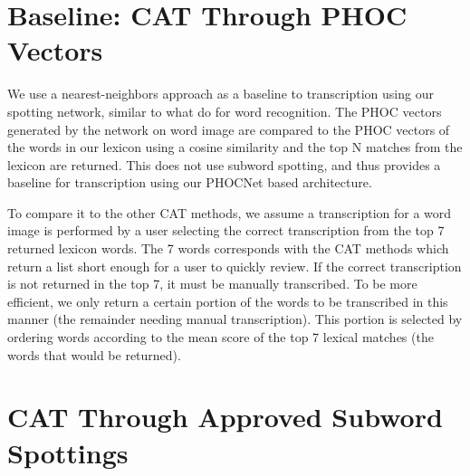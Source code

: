 \documentclass[ms,electronic,twosidetoc,letterpaper,chaptercenter,parttop,lof,lot]{byumsphd}
\begin{document}
\section{Baseline: CAT Through PHOC Vectors}
We use a nearest-neighbors approach as a baseline to transcription using our spotting network, similar to what \cite{krishnan2016} do for word recognition. The PHOC vectors generated by the network on word image are compared to the PHOC vectors of the  words in our lexicon using a cosine similarity and the top N matches from the lexicon are returned. This does not use subword spotting, and thus provides a baseline for transcription using our PHOCNet based architecture.

To compare it to the other CAT methods, we assume a transcription for a word image is performed by a user selecting the correct transcription from the top 7 returned lexicon words. The 7 words corresponds with the CAT methods which return a list short enough for a user to quickly review. If the correct transcription is not returned in the top 7, it must be manually transcribed.
To be more efficient, we only return a certain portion of the words to be transcribed in this manner (the remainder needing manual transcription). This portion is selected by ordering words according to the mean score of the top 7 lexical matches (the words that would be returned).







\section{CAT Through Approved Subword Spottings}
\end{document}
